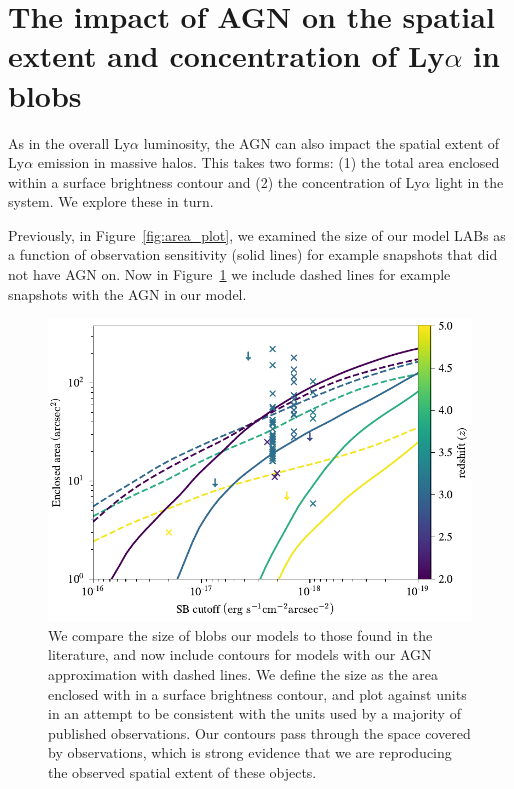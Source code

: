 \section{The impact of AGN on the spatial extent and concentration of Ly\texorpdfstring{$\alpha$}{a} in blobs}

As in the overall Ly$\alpha$ luminosity, the AGN can also impact the spatial extent of Ly$\alpha$ emission in massive halos.
This takes two forms: (1) the total area enclosed within a surface brightness contour and (2) the concentration of Ly$\alpha$ light in the system.
We explore these in turn.

Previously, in Figure~\ref{fig:area_plot}, we examined the size of our model LABs as a function of observation sensitivity (solid lines) for example snapshots that did not have AGN on.
Now in Figure~\ref{fig:agn_area_plot} we include dashed lines for example snapshots with the AGN in our model.

\begin{figure}
    \centering
    \includegraphics[width=\textwidth,keepaspectratio]{figures/agn_area_profile.pdf}
    \caption{
        We compare the size of blobs our models to those found in the literature, and now include contours for models with our AGN approximation with dashed lines.
        We define the size as the area enclosed with in a surface brightness contour, and plot against units in an attempt to be consistent with the units used by a majority of published observations.
        Our contours pass through the space covered by observations, which is strong evidence that we are reproducing the observed spatial extent of these objects.
    }
  \label{fig:agn_area_plot}
\end{figure}

